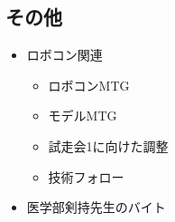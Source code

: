 \documentclass[uplatex, onecolumn, 10pt]{jsarticle}
\begin{document}
\subsection*{その他}
\begin{itemize}
    \item ロボコン関連
		\begin{itemize}
			\item ロボコンMTG
			\item モデルMTG
			\item 試走会1に向けた調整
			\item 技術フォロー
		\end{itemize}
    \item 医学部剣持先生のバイト
\end{itemize}
\end{document}

